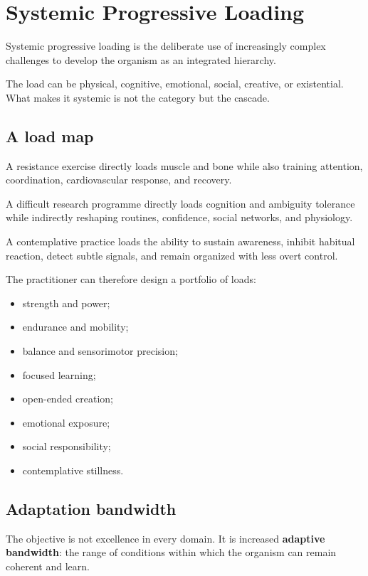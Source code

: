 \chapter{Systemic Progressive Loading}

Systemic progressive loading is the deliberate use of increasingly complex challenges to develop the organism as an integrated hierarchy.

The load can be physical, cognitive, emotional, social, creative, or existential. What makes it systemic is not the category but the cascade.

\section{A load map}

A resistance exercise directly loads muscle and bone while also training attention, coordination, cardiovascular response, and recovery.

A difficult research programme directly loads cognition and ambiguity tolerance while indirectly reshaping routines, confidence, social networks, and physiology.

A contemplative practice loads the ability to sustain awareness, inhibit habitual reaction, detect subtle signals, and remain organized with less overt control.

The practitioner can therefore design a portfolio of loads:

\begin{itemize}
\tightlist
\item
  strength and power;
\item
  endurance and mobility;
\item
  balance and sensorimotor precision;
\item
  focused learning;
\item
  open-ended creation;
\item
  emotional exposure;
\item
  social responsibility;
\item
  contemplative stillness.
\end{itemize}

\section{Adaptation bandwidth}

The objective is not excellence in every domain. It is increased \textbf{adaptive bandwidth}: the range of conditions within which the organism can remain coherent and learn.

